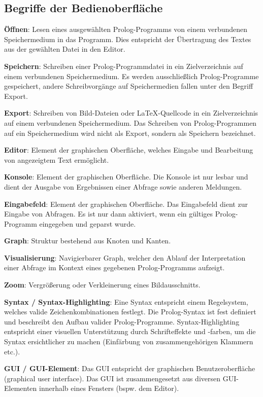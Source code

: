\documentclass[parskip=full,11pt,twoside]{scrartcl}
\begin{document}
\subsection{Begriffe der Bedienoberfläche}
\textbf{Öffnen}:
Lesen eines ausgewählten Prolog-Programms von einem verbundenen Speichermedium in das Programm. Dies entspricht der Übertragung des Textes aus der gewählten Datei in den Editor.

\textbf{Speichern}:
Schreiben einer Prolog-Programmdatei in ein Zielverzeichnis auf einem verbundenen Speichermedium. Es werden ausschließlich Prolog-Programme gespeichert, andere Schreibvorgänge auf Speichermedien fallen unter den Begriff Export.

\textbf{Export}:
Schreiben von Bild-Dateien oder LaTeX-Quellcode in ein Zielverzeichnis auf einem verbundenen Speichermedium. Das Schreiben von Prolog-Programmen auf ein Speichermedium wird nicht als Export, sondern als Speichern bezeichnet.

\textbf{Editor}:
Element der graphischen Oberfläche, welches Eingabe und Bearbeitung von angezeigtem Text ermöglicht.

\textbf{Konsole}:
Element der graphischen Oberfläche. Die Konsole ist nur lesbar und dient der Ausgabe von Ergebnissen einer Abfrage sowie anderen Meldungen. 

\textbf{Eingabefeld}:
Element der graphischen Oberfläche. Das Eingabefeld dient zur Eingabe von Abfragen. Es ist nur dann aktiviert, wenn ein gültiges Prolog-Programm eingegeben und geparst wurde.

\textbf{Graph}:
Struktur bestehend aus Knoten und Kanten.

\textbf{Visualisierung}:
Navigierbarer Graph, welcher den Ablauf der Interpretation einer Abfrage im Kontext eines gegebenen Prolog-Programms aufzeigt.

\textbf{Zoom}:
Vergrößerung oder Verkleinerung eines Bildausschnitts.

\textbf{Syntax / Syntax-Highlighting}:
Eine Syntax entspricht einem Regelsystem, welches valide Zeichenkombinationen festlegt. Die Prolog-Syntax ist fest definiert und beschreibt den Aufbau valider Prolog-Programme. Syntax-Highlighting entspricht einer visuellen Unterstützung durch Schrifteffekte und -farben, um die Syntax ersichtlicher zu machen (Einfärbung von zusammengehörigen Klammern etc.).

\textbf{GUI / GUI-Element}:
Das GUI entspricht der graphischen Benutzeroberfläche (graphical user interface). Das GUI ist zusammengesetzt aus diversen GUI-Elementen innerhalb eines Fensters (bspw. dem Editor).
\end{document}
